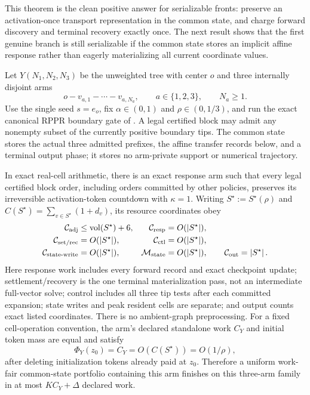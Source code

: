 This theorem is the clean positive answer for serializable fronts: preserve
an activation-once transport representation in the common state, and charge
forward discovery and terminal recovery exactly once.  The next result shows
that the first genuine branch is still serializable if the common state stores
an implicit affine response rather than eagerly materializing all current
coordinate values.

\begin{theorem}
\label{thm:three-arm-spider-token-countdown}
Let $Y(N_1,N_2,N_3)$ be the unweighted tree with center $o$ and three
internally disjoint arms
\begin{equation*}
 o-v_{a,1}-\cdots-v_{a,N_a},
 \qquad a\in\{1,2,3\},\qquad N_a\geq1.
\end{equation*}
Use the single seed $s=e_o$, fix $\alpha\in(0,1)$ and
$\rho\in(0,1/3)$, and run the exact canonical RPPR boundary gate of
.  A legal certified block may admit any
nonempty subset of the currently positive boundary tips.  The common state
stores the actual three admitted prefixes, the affine transfer records below,
and a terminal output phase; it stores no arm-private support or numerical
trajectory.

In exact real-cell arithmetic, there is an exact response arm such that every
legal certified block order, including orders committed by other policies,
preserves its irreversible activation-token countdown with $\kappa=1$.
Writing $S^\star:=S^\star(\rho)$ and
$C(S^\star)=\sum_{v\in S^\star}(1+d_v)$, its resource coordinates obey
\begin{align}
 \mathcal C_{\rm adj}
 &\leq \operatorname{vol}(S^\star)+6,
 &
 \mathcal C_{\rm resp}
 &=O(\left\lvert S^\star \right\rvert),
 \notag\\
 \mathcal C_{\rm set/rec}
 &=O(\left\lvert S^\star \right\rvert),
 &
 \mathcal C_{\rm ctl}
 &=O(\left\lvert S^\star \right\rvert),
 \label{eq:spider-resource-ledger}\\
 \mathcal C_{\rm state\text{-}write}
 &=O(\left\lvert S^\star \right\rvert),
 &
 \mathcal M_{\rm state}
 &=O(\left\lvert S^\star \right\rvert),
 \qquad
 \mathcal C_{\rm out}=\left\lvert S^\star \right\rvert.
 \notag
\end{align}
Here response work includes every forward record and exact checkpoint update;
settlement/recovery is the one terminal materialization pass, not an
intermediate full-vector solve; control includes all three tip tests after
each committed expansion; state writes and peak resident cells are separate;
and output counts exact listed coordinates.  There is no ambient-graph
preprocessing.  For a fixed cell-operation convention, the arm's declared
standalone work $C_Y$ and initial token mass are equal and satisfy
\begin{equation}
 \Phi_Y(z_0)=C_Y=O(C(S^\star))=O(1/\rho),
 \label{eq:spider-token-work}
\end{equation}
after deleting initialization tokens already paid at $z_0$.  Therefore a
uniform work-fair common-state portfolio containing this arm finishes on this
three-arm family in at most $K C_Y+\Delta$ declared work.


\end{theorem}
